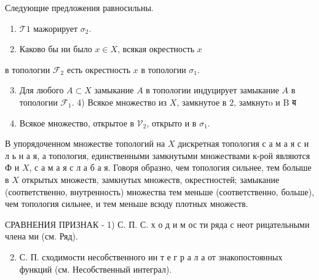 \documentclass[10pt]{article}
\begin{document}
Следующие предложения равносильны.



\begin{enumerate}

  \item $\mathscr{\mathscr { T }} 1$ мажорирует $\mathscr{\sigma}_{2}$.



  \item Каково бы ни было $x \in X$, всякая окрестность $x$



\end{enumerate}



в топологии $\mathscr{F}_{2}$ есть окрестность $x$ в топологии $\mathscr{\sigma}_{1}$.



\begin{enumerate}

  \setcounter{enumi}{2}

  \item Для любого $A \subset X$ замыкание $A$ в топологии индуцирует замыкание $A$ в топологии $\mathscr{F}_{1}$. 4) Всякое множество из $X$, замкнутое в $\mathscr{2}$, замкнутo и $\mathrm{B}$ ब



  \item Всякое множество, открытое в $\mathscr{V}_{2}$, открыто и в $\mathscr{\sigma}_{1}$.



\end{enumerate}



В упорядоченном множестве топологий на $X$ дискретная топология с а м а я с и л ь н а я, а топология, единственными замкнутыми множествами к-рой являются Ф и $X$, с а м а я с л а б а я. Говоря образно, чем топология сильнее, тем болыше в $X$ открытых множеств, замкнутых множеств, окрестностей; замыкание (соответственно, внутренность) множества тем меньше (соответственно, больше), чем топология сильнее, и тем меньше всюду плотных множеств.



СРАВНЕНИЯ ПРИЗНАК - 1) С. П. С. х о д и м ос ти ряда с неот рицательными члена ми (см. Ряд).



\begin{enumerate}

  \setcounter{enumi}{1}

  \item С. П. сходимости несобственного ин т е г р а л а от знакопостоянных функций (см. Несобственный интеграл).

\end{enumerate}
\end{document}
